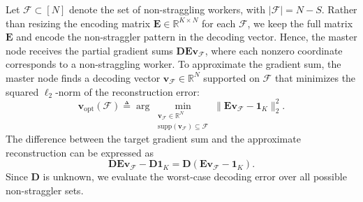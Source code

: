 \documentclass[lettersize,journal]{IEEEtran}
\renewcommand{\v}{\boldsymbol{v}}
\newcommand{\norm}[1]{\left\lVert#1\right\rVert}
\newcommand{\ones}[1]{\boldsymbol{1}_{#1}}
\newcommand{\F}{\mathcal{F}}
\newcommand{\vopt}{\boldsymbol{v}_{\mathrm{opt}}}
\newcommand{\BE}{\boldsymbol{E}}
\newcommand{\DD}{\boldsymbol{D}}
\newcommand{\RR}{\mathbb{R}}
\newcommand{\supp}[1]{\mathrm{supp}(#1)}
\newcommand{\lele}{\textcolor{cyan}}
\begin{document}
Let $\F \subset [N]$ denote the set of non-straggling workers, with $|\F| = N-S$.
Rather than resizing the encoding matrix $\BE \in \mathbb{R}^{K\times N}$ for each $\F$, 
we keep the full matrix $\BE$ and encode the non-straggler pattern in the decoding vector.
Hence, the master node receives the partial gradient sums $\DD \BE \v_\F$, 
where each nonzero coordinate corresponds to a non-straggling worker. 
To approximate the gradient sum, the master node finds a decoding vector $\v_\F \in \mathbb{R}^N$ 
supported on $\F$ that minimizes the squared $\ell_2$-norm of the reconstruction error:
\begin{equation*}
    \vopt(\F) \triangleq \arg\min_{\substack{\v_\F \in \mathbb{R}^N \\ \supp{\v_\F} \subseteq \F}} 
    \|\BE \v_\F - \ones{K}\|_2^2.
\end{equation*}
The difference between the target gradient sum and the approximate reconstruction can be expressed as
\begin{equation*}
    \DD \BE \v_\F - \DD\ones{K} = \DD(\BE\v_\F -\ones{K}).
\end{equation*}
Since $\DD$ is unknown, we evaluate the worst-case decoding error over all possible non-straggler sets.
\end{document}
